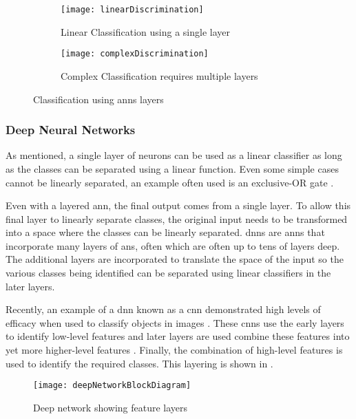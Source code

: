 \begin{figure}[h]
\centering
  \begin{subfigure}{.4\textwidth}
    \centering
    \texttt{[image: linearDiscrimination]}
    \captionsetup{width=.8\textwidth, justification=centering, skip=20pt}
    \caption{Linear Classification using a single layer}
    \label{fig:linear discrimination}
  \end{subfigure}%
  \begin{subfigure}{.4\textwidth}
    \centering
    \texttt{[image: complexDiscrimination]}
    \captionsetup{width=.8\textwidth, justification=centering, skip=10pt}
    \caption{Complex Classification requires multiple layers}
    \label{fig:complex discrimination}
  \end{subfigure}
\captionsetup{justification=centering, skip=10pt}
\caption{Classification using \acp{ann} layers \cite{NNintro_Bullinaria}}
\label{fig:Discrimination}
\end{figure}


\subsubsection{Deep Neural Networks}
\label{sec:Deep Neural Networks}

As mentioned, a single layer of neurons can be used as a linear classifier as long as the classes can be separated using a linear function.
Even some simple cases cannot be linearly separated, an example often used is an exclusive-OR gate \cite{NNintro_Bullinaria}.

Even with a layered \ac{ann}, the final output comes from a single layer. To allow this final layer to linearly separate classes, the original input needs to be transformed into a space where the classes can be linearly separated.
\acfp{dnn} are \acp{ann} that incorporate many layers of \acp{an}, often which are often up to tens of layers deep.
The additional layers are incorporated to translate the space of the input so the various classes being identified can be separated using linear classifiers in the later layers.

Recently, an example of a \ac{dnn} known as a \acf{cnn} demonstrated high levels of efficacy when used to classify objects in images \cite{krizhevsky2012imagenet}.
These \acp{cnn} use the early layers to identify low-level features and later layers are used combine these features into yet more higher-level features \cite{Kwolek2005}\cite{wikipedia_deep_learning}\cite{deeplearning4j}.
Finally, the combination of high-level features is used to identify the required classes.
This layering is shown in .
\begin{figure}[h]
\centering
\texttt{[image: deepNetworkBlockDiagram]}
\captionsetup{justification=centering, skip=5pt}
\caption{Deep network showing feature layers}
\label{fig:Deep network showing feature layers}
\end{figure}

